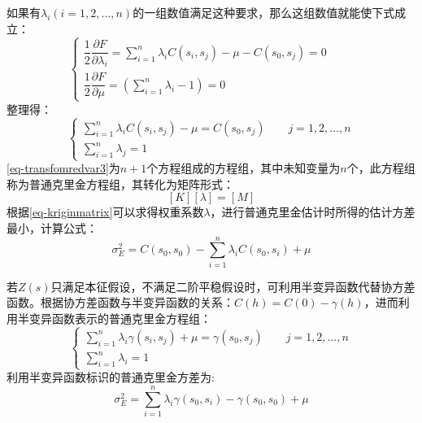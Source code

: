 如果有$\lambda_i(i=1,2,\dots,n)$的一组数值满足这种要求，那么这组数值就能使下式成立：
\begin{equation}
    \begin{cases}
        \dfrac{1}{2}\dfrac{\partial F}{\partial \lambda_i} = \sum\limits_{i=1}^{n}\lambda_i C(s_i,s_j) - \mu - C(s_0,s_j) = 0 \qquad \\
        \dfrac{1}{2}\dfrac{\partial F}{\partial \mu}= \left( \sum\limits_{i=1}^{n}\lambda_i -1 \right) = 0
    \end{cases}
    \label{eq-transfomredvar2}
\end{equation}
整理得：
\begin{equation}
    \begin{cases}
        \sum\limits_{i=1}^{n}\lambda_iC(s_{i},s_j) -\mu = C(s_0,s_j) \qquad j=1,2,\dots,n \\
        \sum\limits_{i=1}^{n}\lambda_j = 1
    \end{cases}
    \label{eq-transfomredvar3}
\end{equation}
\cref{eq-transfomredvar3}为$n+1$个方程组成的方程组，其中未知变量为$n$个，此方程组称为\textcolor[rgb]{1,0,0}{普通克里金方程组}，其转化为矩阵形式：
\begin{equation}
    \left[ K \right]\left[ \lambda \right] = \left[ M \right]
    \label{eq-kriginmatrix}
\end{equation}
根据\cref{eq-kriginmatrix}可以求得权重系数$\lambda$，进行普通克里金估计时所得的估计方差最小，计算公式：
\begin{equation}
    \sigma_E^2 = C(s_0,s_0) - \sum\limits_{i=1}^{n}\lambda_i C(s_0,s_i) + \mu
    \label{eq-minimalvar}
\end{equation}

若$Z(s)$只满足本征假设，不满足二阶平稳假设时，可利用半变异函数代替协方差函数。根据协方差函数与半变异函数的关系：$C(h) = C(0) - \gamma(h)$，进而利用半变异函数表示的普通克里金方程组：
\begin{equation}
    \begin{cases}
        \sum\limits_{i=1}^{n}\lambda_{i}\gamma(s_i,s_j) + \mu = \gamma(s_{0},s_j) \qquad j=1,2,\dots,n \\
        \sum\limits_{i=1}^{n}\lambda_{i}=1
    \end{cases}
    \label{equ-krigingsemivariation}
\end{equation}
利用半变异函数标识的普通克里金方差为:
\begin{equation}
    \sigma_E^2 = \sum\limits_{i=1}^{n}\lambda_i\gamma(s_0,s_i) - \gamma(s_0,s_0) + \mu
    \label{eq-semivariationvar}
\end{equation}



